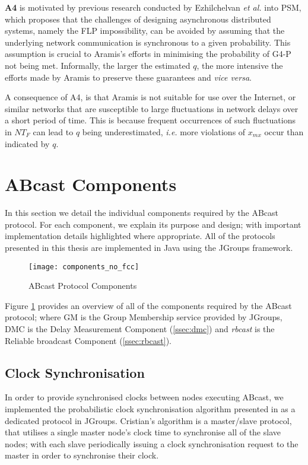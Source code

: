 \begin{description}
        \textbf{A4} is motivated by previous research conducted by Ezhilchelvan \emph{et al.} \citep{Ezhilchelvan:2010:LPR:1773912.1773927} into PSM, which proposes that the challenges of designing asynchronous distributed systems, namely the FLP impossibility, can be avoided by assuming that the underlying network communication is synchronous to a given probability.  This assumption is crucial to \textsf{Aramis}'s efforts in minimising the probability of G4-P not being met.  Informally, the larger the estimated $q$, the more intensive the efforts made by \textsf{Aramis} to preserve these guarantees and \emph{vice versa}.   
        
        A consequence of A4, is that \textsf{Aramis} is not suitable for use over the Internet, or similar networks that are susceptible to large fluctuations in network delays over a short period of time.  This is because frequent occurrences of such fluctuations in $NT_F$ can lead to $q$ being underestimated, \emph{i.e.} more violations of $x_{mx}$ occur than indicated by $q$.          
    \end{description}
    
\section{ABcast Components}
In this section we detail the individual components required by the \textsf{ABcast} protocol.  For each component, we explain its purpose and design; with important implementation details highlighted where appropriate.  All of the protocols presented in this thesis are implemented in Java using the JGroups framework.  

    \begin{figure}[!h] 
        \centering    
         \texttt{[image: components\_no\_fcc]}
         \caption[\textsf{ABcast} Protocol Components Overview]{\textsf{ABcast} Protocol Components}
         \label{fig:abcast_components}
    \end{figure}
    
   Figure \ref{fig:abcast_components} provides an overview of all of the components required by the \textsf{ABcast} protocol; where GM is the Group Membership service provided by JGroups, DMC is the Delay Measurement Component (\ref{ssec:dmc}) and \emph{rbcast} is the Reliable broadcast Component (\ref{ssec:rbcast}).  

    \subsection{Clock Synchronisation}\label{ssec:clocksynch}
    In order to provide synchronised clocks between nodes executing \textsf{ABcast}, we implemented the probabilistic clock synchronisation algorithm presented in \citep{Cristian:1996:SA:227210.227231} as a dedicated protocol in JGroups.  Cristian's algorithm is a master/slave protocol, that utilises a single master node's clock time to synchronise all of the slave nodes; with each slave periodically issuing a clock synchronisation request to the master in order to synchronise their clock.  
            
